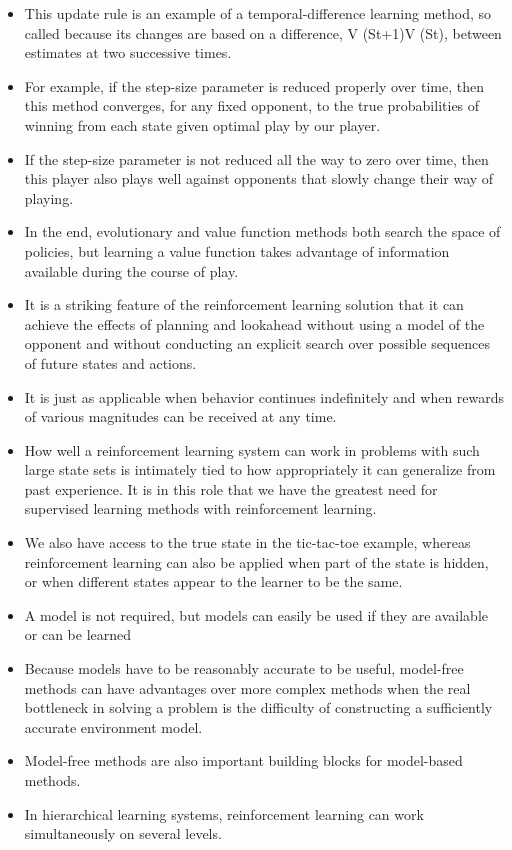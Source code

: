 \documentclass{article}
\begin{document}
\begin{itemize}
    \item This update rule is an example of a temporal-difference learning method, so called because its changes are based on a difference, V (St+1)\textminus V (St), between estimates at two successive times.
    \item For example, if the step-size parameter is reduced properly over time, then this method converges, for any fixed opponent, to the true probabilities of winning from each state given optimal play by our player.
    \item If the step-size parameter is not reduced all the way to zero over time, then this player also plays well against opponents that slowly change their way of playing.
    \item In the end, evolutionary and value function methods both search the space of policies, but learning a value function takes advantage of information available during the course of play.
    \item It is a striking feature of the reinforcement learning solution that it can achieve the effects of planning and lookahead without using a model of the opponent and without conducting an explicit search over possible sequences of future states and actions.
    \item It is just as applicable when behavior continues indefinitely and when rewards of various magnitudes can be received at any time.
    \item How well a reinforcement learning system can work in problems with such large state sets is intimately tied to how appropriately it can generalize from past experience. It is in this role that we have the greatest need for supervised learning methods with reinforcement learning.
    \item We also have access to the true state in the tic-tac-toe example, whereas reinforcement learning can also be applied when part of the state is hidden, or when different states appear to the learner to be the same.
    \item A model is not required, but models can easily be used if they are available or can be learned
    \item Because models have to be reasonably accurate to be useful, model-free methods can have advantages over more complex methods when the real bottleneck in solving a problem is the difficulty of constructing a sufficiently accurate environment model.
    \item Model-free methods are also important building blocks for model-based methods.
    \item In hierarchical learning systems, reinforcement learning can work simultaneously on several levels.
\end{itemize}
\end{document}
